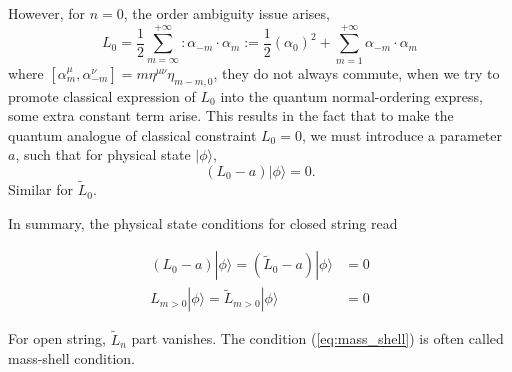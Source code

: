 \documentclass[graybox,envcountchap,sectrefs]{svmono}
\begin{document}
	
However, for $n=0$, the order ambiguity issue  arises,
\begin{equation}
L_0=\frac{1}{2}\sum_{m=\infty}^{+\infty}:\alpha_{-m}\cdot\alpha_{m}:=\frac{1}{2}(\alpha_0)^2	+\sum_{m=1}^{+\infty} \alpha_{-m}\cdot \alpha_{m}
\end{equation}
where $[\alpha^{\mu}_{m},\alpha^{\nu}_{-m}]=m\eta^{\mu\nu}\eta_{m-m,0}$, they do not always commute, when we try to promote classical expression of $L_0$ into the quantum normal-ordering express, some extra constant term arise. This results in the fact that to make the quantum analogue of classical constraint $L_0=0$, we must introduce a parameter $a$, such that for physical state $|\phi\rangle$,
\begin{equation}
(L_0-a)|\phi\rangle=0.	
\end{equation}
Similar for $\tilde{L}_0$.


	In summary, the physical state conditions for closed string read
\begin{svgraybox}
\begin{align}
\left({L}_{0}-a\right)|\phi\rangle=\left(\tilde{L}_{0}-a\right)|\phi\rangle &=0 \label{eq:mass_shell}\\
{L}_{m>0}|\phi\rangle =\tilde{L}_{m>0}|\phi\rangle&=0
\end{align}
\end{svgraybox}
For open string, $\tilde{L}_n$ part vanishes. The condition (\ref{eq:mass_shell}) is often called mass-shell condition.
\end{document}
